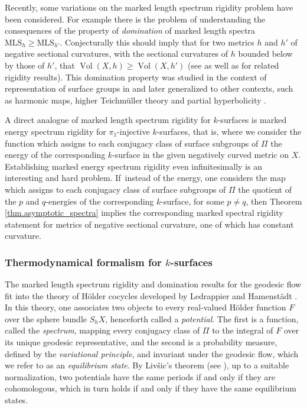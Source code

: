 \documentclass[JEP,XML,SOM,Unicode,NoEqCountersInSection,published]{cedram}
\newcommand{\ksurface}{$k$\nobreakdash-surface\xspace}
\newcommand{\ksurfaces}{$k$\nobreakdash-surfaces\xspace}
\theoremstyle{plain}
\theoremstyle{definition}
\newcommand{\MLS}{\mathrm{MLS}}
\DeclareMathOperator{\Vol}{Vol}
\begin{document}
Recently, some variations on the marked length spectrum rigidity problem have been considered. For example there is the problem of understanding the consequences of the property of \emph{domination} of marked length spectra $\MLS_h\geq\MLS_{h'}$. Conjecturally this should imply that for two metrics $h$ and $h'$ of negative sectional curvatures, with the sectional curvatures of $h$ bounded below by those of $h'$, that $\Vol(X,h)\geq\Vol(X,h')$ (see \cite{Croke_Dairbekov,Croke_Dairbekov_Sharafutdinov} as well as \cite{Gogolev_Reber} for related rigidity results). This domination property was studied in the context of representation of surface groups in \cite{Deroin_Tholozan,Gueritaud_Kassel_Wolff} and later generalized to other contexts, such as harmonic maps, higher Teichmüller theory and partial hyperbolicity \cite{Alvarez_Yang,Barman_Gupta,Dai_Li,Li,Sagman}.

A direct analogue of marked length spectrum rigidity for \ksurfaces is marked energy spectrum rigidity for $\pi_1$-injective \ksurfaces, that is, where we consider the function which assigns to each conjugacy class of surface subgroups of $\Pi$ the energy of the corresponding \ksurface in the given negatively curved metric on $X$. Establishing marked energy spectrum rigidity even infinitesimally is an interesting and hard problem. If~instead of the energy, one considers the map which assigns to each conjugacy class of surface subgroups of $\Pi$ the quotient of the $p$ and $q$-energies of the corresponding \ksurface, for some $p \neq q$, then Theorem \ref{thm.asymptotic_spectra} implies the corresponding marked spectral rigidity statement for metrics of negative sectional curvature, one of which has constant curvature.

\subsubsection{Thermodynamical formalism for \protect\ksurfaces}

The marked length spectrum rigidity and domination results for the geodesic flow fit into the theory of Hölder cocycles developed by Ledrappier and Hamenstädt \cite{HamenstadtMLS,Ledrappier_bord}. In this theory, one associates two objects to every real-valued Hölder function $F$ over the sphere bundle $S_hX$, henceforth called a \emph{potential}. The first is a function, called the \emph{spectrum}, mapping every conjugacy class of $\Pi$ to the integral of $F$ over its unique geodesic representative, and the second is a probability measure, defined by the \emph{variational principle}, and invariant under the geodesic flow, which we refer to as an \emph{equilibrium state}. By Liv\v{s}ic's theorem (see \cite{Guillemin_Kazhdan,Livsic}), up to a suitable normalization, two potentials have the same periods if and only if they are cohomologous, which in turn holds if and only if they have the same equilibrium states.
\end{document}
